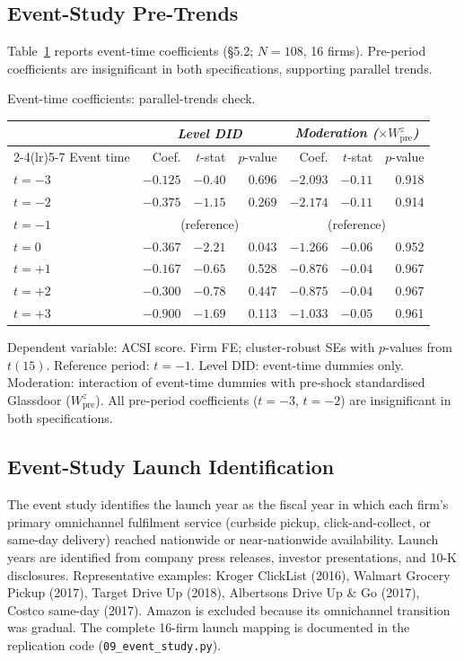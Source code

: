 \documentclass[msom,dblanonrev]{informs4}
\begin{document}
{\subsection*{Event-Study Pre-Trends}

Table~\ref{tab:ec:pretrends} reports event-time coefficients (\S5.2; $N = 108$, 16 firms). Pre-period coefficients are insignificant in both specifications, supporting parallel trends.

\begin{table}[htbp]
\TABLE
{Event-time coefficients: parallel-trends check.\label{tab:ec:pretrends}}
{{\setlength{\tabcolsep}{4pt}\small
\begin{tabular}{@{}lrrrrrr@{}}
\toprule
& \multicolumn{3}{c}{\textit{Level DID}} & \multicolumn{3}{c}{\textit{Moderation ($\times W^z_{\mathrm{pre}}$)}} \\
\cmidrule(lr){2-4}\cmidrule(lr){5-7}
Event time & Coef. & $t$-stat & $p$-value & Coef. & $t$-stat & $p$-value \\
\midrule
$t = -3$ & $-0.125$ & $-0.40$ & 0.696 & $-2.093$ & $-0.11$ & 0.918 \\
$t = -2$ & $-0.375$ & $-1.15$ & 0.269 & $-2.174$ & $-0.11$ & 0.914 \\
$t = -1$ & \multicolumn{3}{c}{(reference)} & \multicolumn{3}{c}{(reference)} \\
$t = 0$ & $-0.367$ & $-2.21$ & 0.043 & $-1.266$ & $-0.06$ & 0.952 \\
$t = +1$ & $-0.167$ & $-0.65$ & 0.528 & $-0.876$ & $-0.04$ & 0.967 \\
$t = +2$ & $-0.300$ & $-0.78$ & 0.447 & $-0.875$ & $-0.04$ & 0.967 \\
$t = +3$ & $-0.900$ & $-1.69$ & 0.113 & $-1.033$ & $-0.05$ & 0.961 \\
\bottomrule
\end{tabular}
}}{Dependent variable: ACSI score. Firm FE; cluster-robust SEs with $p$-values from $t(15)$. Reference period: $t = -1$. Level DID: event-time dummies only. Moderation: interaction of event-time dummies with pre-shock standardised Glassdoor ($W^z_{\mathrm{pre}}$). All pre-period coefficients ($t = -3$, $t = -2$) are insignificant in both specifications.}
\end{table}

\subsection*{Event-Study Launch Identification}

The event study identifies the launch year as the fiscal year in which each firm's primary omnichannel fulfilment service (curbside pickup, click-and-collect, or same-day delivery) reached nationwide or near-nationwide availability. Launch years are identified from company press releases, investor presentations, and 10-K disclosures. Representative examples: Kroger ClickList (2016), Walmart Grocery Pickup (2017), Target Drive Up (2018), Albertsons Drive Up \& Go (2017), Costco same-day (2017). Amazon is excluded because its omnichannel transition was gradual. The complete 16-firm launch mapping is documented in the replication code (\texttt{09\_event\_study.py}).

}
\end{document}
